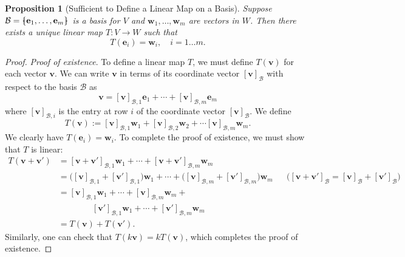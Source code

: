 \documentclass[a4paper,11pt]{book}
\newtheorem{proposition}[theorem]{Proposition}
\theoremstyle{definition}
\newcommand{\be}{\begin{equation}}
\newcommand{\ee}{\end{equation}}
\newcommand{\ve}[1]{\mathbf{#1}}
\newcommand{\basis}[1]{{\mathcal #1}}
\newcommand{\bmark}{\raisebox{.53ex}{\rule{.2em}{.1ex}}}
\newcommand{\bopen}{{\protect\ooalign{\{\cr\hfil\bmark\hfil\cr}}}
\newcommand{\bclose}{{\protect\ooalign{\}\cr\hfil\bmark\hfil\cr}}}
\begin{document}
\begin{proposition}[Sufficient to Define a Linear Map on a Basis] \label{defining_linear_map_on_basis} Suppose $\basis{B} = \bopen \ve{e}_1, \ldots, \ve{e}_m \bclose$ is a basis for $V$ and $\ve{w}_1, \ldots, \ve{w}_m$ are vectors in $W$. Then there exists a unique linear map $T : V \rightarrow W$ such that
\[
 T(\ve{e}_i) = \ve{w}_i, \quad i = 1 \ldots m.
\]
\end{proposition}
\begin{proof} {\em Proof of existence}. To define a linear map $T$, we must define $T(\ve{v})$ for each vector $\ve{v}$. We can write $\ve{v}$ in terms of its coordinate vector $[\ve{v}]_\basis{B}$ with respect to the basis $\basis{B}$ as
\be \label{expansion_of_v_in_coords}
 \ve{v} = [\ve{v}]_{\basis{B}, 1} \ve{e}_1 + \cdots + [\ve{v}]_{\basis{B}, m} \ve{e}_m
\ee
where $[\ve{v}]_{\basis{B}, i}$ is the entry at row $i$ of the coordinate vector $[\ve{v}]_\basis{B}$. We define
\be \label{formula_for_T}
 T(\ve{v}) := [\ve{v}]_{\basis{B}, 1} \ve{w}_1 + [\ve{v}]_{\basis{B}, 2} \ve{w}_2 + \cdots [\ve{v}]_{\basis{B}, m} \ve{w}_m.
\ee
We clearly have $T(\ve{e}_i) = \ve{w}_i$. To complete the proof of existence, we must show that $T$ is linear:
\begin{align*}
 T(\ve{v} + \ve{v}') &= [\ve{v} + \ve{v}']_{\basis{B},1} \ve{w}_1 + \cdots + [\ve{v} + \ve{v}']_{\basis{B}, m} \ve{w}_m \\
 &= \big([\ve{v}]_{\basis{B}, 1} + [\ve{v}']_{\basis{B}, 1} \big) \ve{w}_1 + \cdots + \big([\ve{v}]_{\basis{B}, m} + [\ve{v}']_{\basis{B}, m}\big) \ve{w}_m && \mbox{($[\ve{v} + \ve{v}']_\basis{B} = [\ve{v}]_\basis{B} + [\ve{v}']_\basis{B}$)} \\
 &=  [\ve{v}]_{\basis{B}, 1} \ve{w}_1 + \cdots + [\ve{v}]_{\basis{B}, m} \ve{w}_m   + \\ & \qquad \qquad  [\ve{v}']_{\basis{B}, 1} \ve{w}_1 + \cdots + [\ve{v}']_{\basis{B}, m} \ve{w}_m  \\
 &= T(\ve{v}) + T(\ve{v}').
\end{align*}
Similarly, one can check that $T(k \ve{v}) = k T(\ve{v})$, which completes the proof of existence. 


\end{proof}
\end{document}
